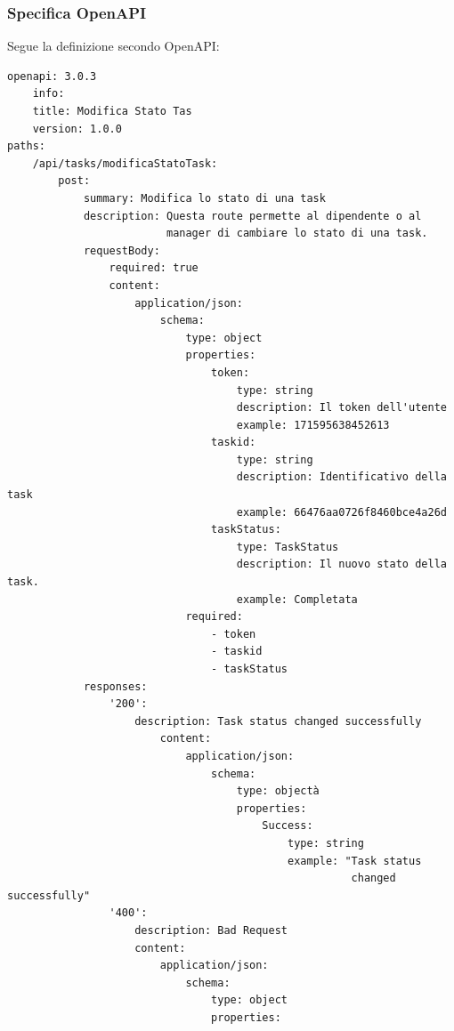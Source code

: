 \documentclass{report}
\begin{document}
\subsubsection*{Specifica OpenAPI}

Segue la definizione secondo OpenAPI:

\begin{verbatim}
openapi: 3.0.3
    info:
    title: Modifica Stato Tas
    version: 1.0.0
paths:
    /api/tasks/modificaStatoTask:
        post:
            summary: Modifica lo stato di una task
            description: Questa route permette al dipendente o al
                         manager di cambiare lo stato di una task.
            requestBody:
                required: true
                content:
                    application/json:
                        schema:
                            type: object
                            properties:
                                token:
                                    type: string
                                    description: Il token dell'utente
                                    example: 171595638452613
                                taskid:
                                    type: string
                                    description: Identificativo della task
                                    example: 66476aa0726f8460bce4a26d
                                taskStatus:
                                    type: TaskStatus
                                    description: Il nuovo stato della task.
                                    example: Completata
                            required:
                                - token
                                - taskid
                                - taskStatus
            responses:
                '200':
                    description: Task status changed successfully
                        content:
                            application/json:
                                schema:
                                    type: objectà
                                    properties:
                                        Success:
                                            type: string
                                            example: "Task status
                                                      changed successfully"
                '400':
                    description: Bad Request
                    content:
                        application/json:
                            schema:
                                type: object
                                properties:

\end{verbatim}
\end{document}
